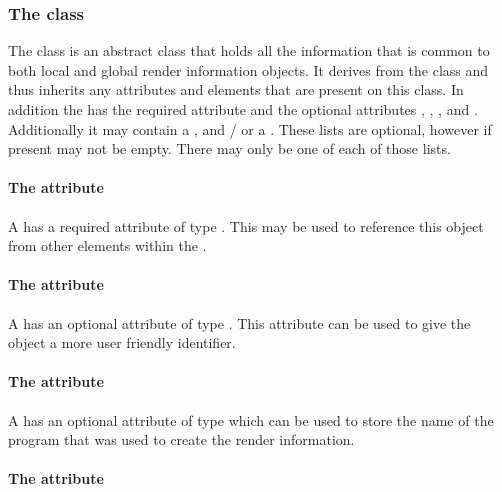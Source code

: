 \subsubsection{The  class}
\label{renderinformationbase-class}

The \RenderInformationBase class is an abstract class that holds all the 
information that is common to both local and global render 
information objects. It  derives from the \SBase class and thus
inherits any attributes and elements that are present on this class. In 
addition the \RenderInformationBase has the required attribute  and the 
optional attributes , , , 
 and . Additionally it may
contain a \ListOfColorDefinitions, \ListOfGradientDefinitions and / or a \ListOfLineEndings. 
These lists are optional, however if present may not be empty. There may only be one 
of each of those lists. 

\paragraph{The \fixttspace{} attribute}

A \RenderInformationBase has a required attribute  of type
. This  may be used to reference this \RenderInformation 
object from other elements within the \RenderPackage.

\paragraph{The \fixttspace{} attribute}

A \RenderInformationBase has an optional attribute  of type
. This  attribute can be used to give the object a 
more user friendly identifier.

\paragraph{The \fixttspace{} attribute}

A \RenderInformationBase has an optional attribute 
of type  which can be used to store the name of the program 
that was used to create the render information.

\paragraph{The \fixttspace{} attribute}

